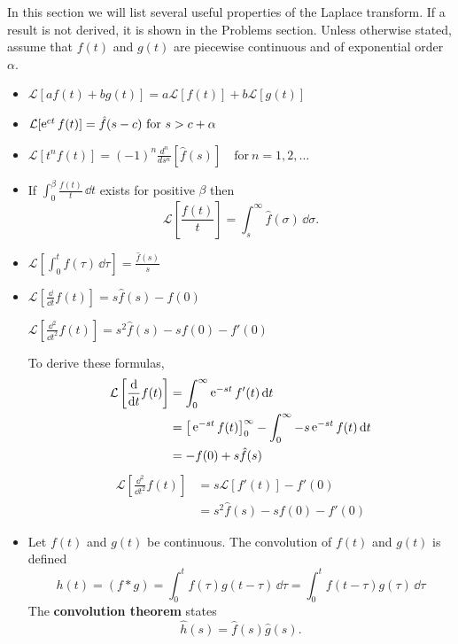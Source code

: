 In this section we will list several useful properties of the Laplace 
transform.  If a result is not derived, it is shown in the Problems section.
Unless otherwise stated, assume that $f(t)$ and $g(t)$ are piecewise
continuous and of exponential order $\alpha$.
\begin{itemize}
\item 
  $\mathcal{L}[a f(t) + b g(t)] = a \mathcal{L}[f(t)] + b \mathcal{L}[g(t)]$
\item 
  $\mathcal{L}[\mathop{\mathrm{e}}\nolimits^{c t} f(t)] = \hat{f}(s-c)\ \mathrm{for}\ s > c + \alpha$
\item 
  $\mathcal{L}[t^n f(t)] = (-1)^n \frac{d^n}{d s^n}[\hat{f}(s)] 
  \quad \mathrm{for}\ n = 1, 2, \ldots$
\item 
  If $\int_0^\beta \frac{f(t)}{t}\,\dd t$ exists for positive $\beta$ then
  \[ 
  \mathcal{L}\left[ \frac{f(t)}{t} \right] = \int_s^\infty \hat{f}(\sigma)\,\dd \sigma.
  \]
\item 
  $\mathcal{L}\left[ \int_0^t f(\tau)\,\dd \tau \right] = \frac{\hat{f}(s)}{s}$
\item 
  $\mathcal{L}\left[ \frac{\dd}{\dd t}f(t)\right] = s \hat{f}(s) - f(0)$

  $\mathcal{L}\left[ \frac{\dd^2}{\dd t^2} f(t)\right] = s^2 \hat{f}(s) - s f(0) - f'(0)$

  To derive these formulas,
  \begin{align*}
    \mathcal{L}\left[ \frac{\mathrm{d}}{\mathrm{d} t}f(t)\right]
    &= \int_0^\infty \mathop{\mathrm{e}}\nolimits^{-s t} f'(t)\,\mathrm{d} t \\
    &= \big[\mathop{\mathrm{e}}\nolimits^{-s t} f(t) \big]_0^\infty - \int_0^\infty -s \mathop{\mathrm{e}}\nolimits^{-s t}f(t)\,\mathrm{d} t \\
    &= -f(0) + s \hat{f}(s)
  \end{align*}
  \begin{align*}
    \mathcal{L}\left[ \frac{\dd^2}{\dd t^2} f(t)\right] 
    &= s \mathcal{L}[f'(t)] - f'(0) \\
    &= s^2 \hat{f}(s) - s f(0) - f'(0)
  \end{align*}

\item Let $f(t)$ and $g(t)$ be continuous.  The convolution of $f(t)$ and 
  $g(t)$ is defined
  \[
  h(t) = (f*g) = \int_0^t f(\tau)g(t-\tau)\,\dd \tau = \int_0^t f(t-\tau)g(\tau)\,\dd \tau 
  \]
  The \textbf{convolution theorem} states
  \[ 
  \hat{h}(s) = \hat{f}(s) \hat{g}(s).
  \]


\end{itemize}
